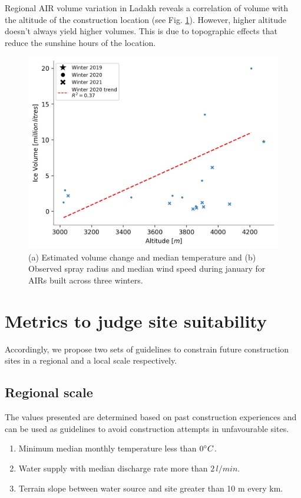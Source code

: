 Regional AIR volume variation in Ladakh reveals a correlation of volume with the altitude of the construction
location (see Fig. \ref{fig:altvsvol}). However, higher altitude doesn't always yield higher volumes. This is
due to topographic effects that reduce the sunshine hours of the location.

\begin{figure}[htb]
\centering
\includegraphics[width=12cm]{figs/altitudevsvolume.png}
\caption{(a) Estimated volume change and median temperature and (b) Observed spray radius and median wind speed
during january for AIRs built across three winters. }
\label{fig:altvsvol}
\end{figure}

\section{Metrics to judge site suitability}

Accordingly, we propose two sets of guidelines to constrain future construction sites in a regional and a local
scale respectively. 

\subsection{Regional scale}

The values presented are determined based on past construction experiences and can be used as guidelines to
avoid construction attempts in unfavourable sites.

\begin{enumerate}

  \item Minimum median monthly temperature less than $0 ^{\circ} C$. 
  \item Water supply with median discharge rate more than $2\, l/min$.
  \item Terrain slope between water source and site greater than 10 m every km. 

\end{enumerate}

